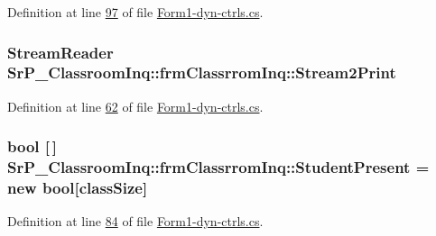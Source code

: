 \-Definition at line \hyperlink{_form1-dyn-ctrls_8cs_source_l00097}{97} of file \hyperlink{_form1-dyn-ctrls_8cs_source}{\-Form1-\/dyn-\/ctrls.\-cs}.

\hypertarget{class_sr_p___classroom_inq_1_1frm_classrrom_inq_aa030f46a7915eae3a0b8b88661be51a8}{
\subsubsection[{\-Stream2\-Print}]{\setlength{\rightskip}{0pt plus 5cm}\-Stream\-Reader {\bf \-Sr\-P\-\_\-\-Classroom\-Inq\-::frm\-Classrrom\-Inq\-::\-Stream2\-Print}}}
\label{class_sr_p___classroom_inq_1_1frm_classrrom_inq_aa030f46a7915eae3a0b8b88661be51a8}


\-Definition at line \hyperlink{_form1-dyn-ctrls_8cs_source_l00062}{62} of file \hyperlink{_form1-dyn-ctrls_8cs_source}{\-Form1-\/dyn-\/ctrls.\-cs}.

\hypertarget{class_sr_p___classroom_inq_1_1frm_classrrom_inq_aa5c7b55e4b30e09f574c44e90b06e7b2}{
\subsubsection[{\-Student\-Present}]{\setlength{\rightskip}{0pt plus 5cm}bool \mbox{[}$\,$\mbox{]} {\bf \-Sr\-P\-\_\-\-Classroom\-Inq\-::frm\-Classrrom\-Inq\-::\-Student\-Present} = new bool\mbox{[}{\bf class\-Size}\mbox{]}}}
\label{class_sr_p___classroom_inq_1_1frm_classrrom_inq_aa5c7b55e4b30e09f574c44e90b06e7b2}


\-Definition at line \hyperlink{_form1-dyn-ctrls_8cs_source_l00084}{84} of file \hyperlink{_form1-dyn-ctrls_8cs_source}{\-Form1-\/dyn-\/ctrls.\-cs}.

